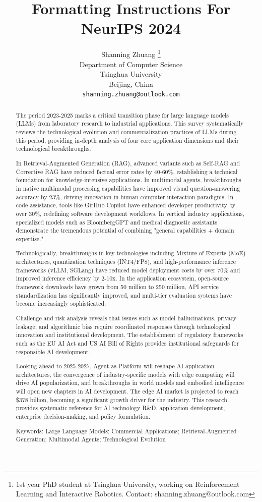 \documentclass{article}
\title{Formatting Instructions For NeurIPS 2024}
\author{%
  Shanning Zhuang \thanks{1st year PhD student at Tsinghua University, working on Reinforcement Learning and Interactive Robotics. Contact: shanning.zhuang@outlook.com} \\
  Department of Computer Science\\
  Tsinghua University\\
  Beijing, China \\
  \texttt{shanning.zhuang@outlook.com} \\
}
\begin{document}
\maketitle


\begin{abstract}
  The period 2023-2025 marks a critical transition phase for large language models (LLMs) from laboratory research to industrial applications. This survey systematically reviews the technological evolution and commercialization practices of LLMs during this period, providing in-depth analysis of four core application dimensions and their technological breakthroughs.

  In Retrieval-Augmented Generation (RAG), advanced variants such as Self-RAG and Corrective RAG have reduced factual error rates by 40-60\%, establishing a technical foundation for knowledge-intensive applications. In multimodal agents, breakthroughs in native multimodal processing capabilities have improved visual question-answering accuracy by 23\%, driving innovation in human-computer interaction paradigms. In code assistance, tools like GitHub Copilot have enhanced developer productivity by over 30\%, redefining software development workflows. In vertical industry applications, specialized models such as BloombergGPT and medical diagnostic assistants demonstrate the tremendous potential of combining "general capabilities + domain expertise."

  Technologically, breakthroughs in key technologies including Mixture of Experts (MoE) architectures, quantization techniques (INT4/FP8), and high-performance inference frameworks (vLLM, SGLang) have reduced model deployment costs by over 70\% and improved inference efficiency by 2-10x. In the application ecosystem, open-source framework downloads have grown from 50 million to 250 million, API service standardization has significantly improved, and multi-tier evaluation systems have become increasingly sophisticated.

  Challenge and risk analysis reveals that issues such as model hallucinations, privacy leakage, and algorithmic bias require coordinated responses through technological innovation and institutional development. The establishment of regulatory frameworks such as the EU AI Act and US AI Bill of Rights provides institutional safeguards for responsible AI development.

  Looking ahead to 2025-2027, Agent-as-Platform will reshape AI application architectures, the convergence of industry-specific models with edge computing will drive AI popularization, and breakthroughs in world models and embodied intelligence will open new chapters in AI development. The edge AI market is projected to reach \$378 billion, becoming a significant growth driver for the industry. This research provides systematic reference for AI technology R\&D, application development, enterprise decision-making, and policy formulation.

  Keywords: Large Language Models; Commercial Applications; Retrieval-Augmented Generation; Multimodal Agents; Technological Evolution
\end{abstract} 
\end{document}
